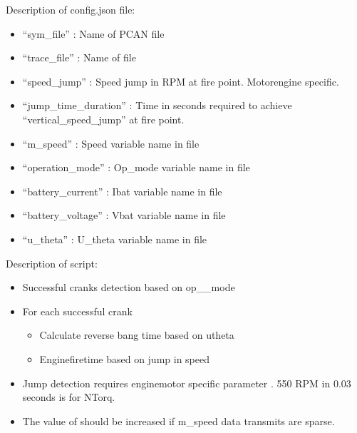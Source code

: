 \documentclass[letterpaper,10pt,english]{sphinxmanual}
\begin{document}
\sphinxAtStartPar
Description of config.json file:
\begin{itemize}
\item {} 
\sphinxAtStartPar
“sym\_file” : Name of PCAN  file

\item {} 
\sphinxAtStartPar
“trace\_file” : Name of  file

\item {} 
\sphinxAtStartPar
“speed\_jump” : Speed jump in RPM at fire point. Motor\sphinxhyphen{}engine specific.

\item {} 
\sphinxAtStartPar
“jump\_time\_duration” : Time in seconds required to achieve “vertical\_speed\_jump” at fire point.

\item {} 
\sphinxAtStartPar
“m\_speed” : Speed variable name in  file

\item {} 
\sphinxAtStartPar
“operation\_mode” : Op\_mode variable name in  file

\item {} 
\sphinxAtStartPar
“battery\_current” : Ibat variable name in  file

\item {} 
\sphinxAtStartPar
“battery\_voltage” : Vbat variable name in  file

\item {} 
\sphinxAtStartPar
“u\_theta” : U\_theta variable name in  file

\end{itemize}

\sphinxAtStartPar
Description of script:
\begin{itemize}
\item {} 
\sphinxAtStartPar
Successful cranks detection based on op\_\_mode

\item {} 
\sphinxAtStartPar
For each successful crank
\begin{itemize}
\item {} 
\sphinxAtStartPar
Calculate reverse bang time based on utheta

\item {} 
\sphinxAtStartPar
Engine\sphinxhyphen{}fire\sphinxhyphen{}time based on jump in speed

\end{itemize}

\item {} 
\sphinxAtStartPar
Jump detection requires engine\sphinxhyphen{}motor specific parameter . 550 RPM in 0.03 seconds is for NTorq.

\item {} 
\sphinxAtStartPar
The value of  should be increased if m\_speed data transmits are sparse.

\end{itemize}
\end{document}
